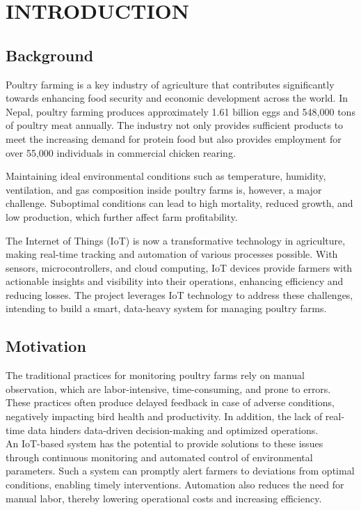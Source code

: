 \documentclass[../main.tex]{subfiles}
\begin{document}
\section{INTRODUCTION}


\subsection{Background}
Poultry farming is a key industry of agriculture that contributes significantly towards enhancing food security and economic development across the world. In Nepal, poultry farming produces approximately 1.61 billion eggs and 548,000 tons of poultry meat annually. The industry not only provides sufficient products to meet the increasing demand for protein food but also provides employment for over 55,000 individuals in commercial chicken rearing.

Maintaining ideal environmental conditions such as temperature, humidity, ventilation, and gas composition inside poultry farms is, however, a major challenge. Suboptimal conditions can lead to high mortality, reduced growth, and low production, which further affect farm profitability.

The Internet of Things (IoT) is now a transformative technology in agriculture, making real-time tracking and automation of various processes possible. With sensors, microcontrollers, and cloud computing, IoT devices provide farmers with actionable insights and visibility into their operations, enhancing efficiency and reducing losses. The project leverages IoT technology to address these challenges, intending to build a smart, data-heavy system for managing poultry farms.
\subsection{Motivation}
  The traditional practices for monitoring poultry farms rely on manual observation, which are labor-intensive, time-consuming, and prone to errors. These practices often produce delayed feedback in case of adverse conditions, negatively impacting bird health and productivity. In addition, the lack of real-time data hinders data-driven decision-making and optimized operations.\\
An IoT-based system has the potential to provide solutions to these issues through continuous monitoring and automated control of environmental parameters. Such a system can promptly alert farmers to deviations from optimal conditions, enabling timely interventions. Automation also reduces the need for manual labor, thereby lowering operational costs and increasing efficiency.
\end{document}
